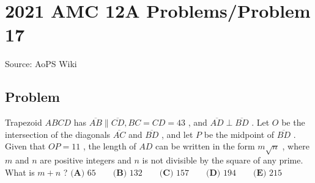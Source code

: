\documentclass[12pt]{article}
\begin{document}
\section*{{2021 AMC 12A Problems/Problem 17}}
Source: AoPS Wiki

\subsection*{Problem}
Trapezoid $ABCD$ has $\overline{AB}\parallel\overline{CD},BC=CD=43$ , and $\overline{AD}\perp\overline{BD}$ . Let $O$ be the intersection of the diagonals $\overline{AC}$ and $\overline{BD}$ , and let $P$ be the midpoint of $\overline{BD}$ . Given that $OP=11$ , the length of $AD$ can be written in the form $m\sqrt{n}$ , where $m$ and $n$ are positive integers and $n$ is not divisible by the square of any prime. What is $m+n$ ? $\textbf{(A) }65 \qquad \textbf{(B) }132 \qquad \textbf{(C) }157 \qquad \textbf{(D) }194\qquad \textbf{(E) }215$
\end{document}
